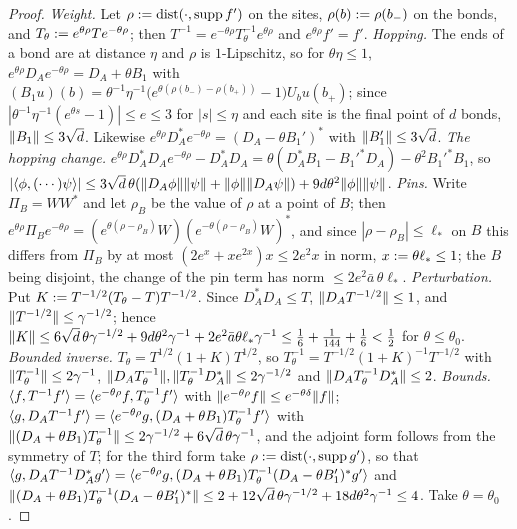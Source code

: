 \begin{proof}
\emph{Weight.} Let $\rho:=\operatorname{dist}(\cdot,\operatorname{supp} f')$ on the sites, $\rho(b):=\rho(b_-)$ on the bonds, and $T_\theta:= e^{\theta\rho}Te^{-\theta\rho}$; then $T^{-1}=e^{-\theta\rho}T_\theta^{-1}e^{\theta\rho}$ and $e^{\theta\rho}f'=f'$. \emph{Hopping.} The ends of a bond are at distance $\eta$ and $\rho$ is $1$-Lipschitz, so for $\theta\eta\le1$, $e^{\theta\rho}D_Ae^{-\theta\rho}=D_A+\theta B_1$ with $(B_1u)(b)=\theta^{-1}\eta^{-1}\big(e^{\theta(\rho(b_-)-\rho(b_+))}-1\big)U_bu(b_+)$; since $|\theta^{-1}\eta^{-1}(e^{\theta s}-1)|\le e\le3$ for $|s|\le\eta$ and each site is the final point of $d$ bonds, $\lVert B_1\rVert\le3\sqrt d$. Likewise $e^{\theta\rho}D_A^*e^{-\theta\rho}=(D_A-\theta B_1')^*$ with $\lVert B_1'\rVert\le3\sqrt d$. \emph{The hopping change.} $e^{\theta\rho}D_A^*D_Ae^{-\theta\rho}-D_A^*D_A=\theta(D_A^*B_1-B_1'^*D_A)-\theta^2B_1'^*B_1$, so $|\langle \phi,(\cdots)\psi\rangle|\le3\sqrt d\,\theta(\lVert D_A\phi\rVert\lVert \psi\rVert+\lVert \phi\rVert\lVert D_A\psi\rVert)+9d\theta^2\lVert \phi\rVert\lVert \psi\rVert$. \emph{Pins.} Write $\Pi_B=WW^*$ and let $\rho_B$ be the value of $\rho$ at a point of $B$; then $e^{\theta\rho}\Pi_Be^{-\theta\rho}=(e^{\theta(\rho-\rho_B)}W)(e^{-\theta(\rho-\rho_B)}W)^*$, and since $|\rho-\rho_B|\le\ell_*$ on $B$ this differs from $\Pi_B$ by at most $(2e^x+xe^{2x})x\le2e^2x$ in norm, $x:=\theta\ell_*\le1$; the $B$ being disjoint, the change of the pin term has norm $\le2e^2\bar a\,\theta\ell_*$. \emph{Perturbation.} Put $K:= T^{-1/2}(T_\theta-T)T^{-1/2}$. Since $D_A^*D_A\le T$, $\lVert D_AT^{-1/2}\rVert\le1$, and $\lVert T^{-1/2}\rVert\le\gamma^{-1/2}$; hence $\lVert K\rVert\le6\sqrt d\,\theta\gamma^{-1/2}+9d\theta^2\gamma^{-1}+2e^2\bar a\theta\ell_*\gamma^{-1}\le\frac16+\frac1{144}+\frac16<\frac12$ for $\theta\le\theta_0$. \emph{Bounded inverse.} $T_\theta=T^{1/2}(1+K)T^{1/2}$, so $T_\theta^{-1}=T^{-1/2}(1+K)^{-1}T^{-1/2}$ with $\lVert T_\theta^{-1}\rVert\le2\gamma^{-1}$, $\lVert D_AT_\theta^{-1}\rVert,\lVert T_\theta^{-1}D_A^*\rVert\le2\gamma^{-1/2}$ and $\lVert D_AT_\theta^{-1}D_A^*\rVert\le2$. \emph{Bounds.} $\langle f,T^{-1}f'\rangle=\langle e^{-\theta\rho}f,T_\theta^{-1}f'\rangle$ with $\lVert e^{-\theta\rho}f\rVert\le e^{-\theta\delta}\lVert f\rVert$; $\langle g,D_AT^{-1}f'\rangle=\langle e^{-\theta\rho}g,(D_A+\theta B_1)T_\theta^{-1}f'\rangle$ with $\lVert (D_A+\theta B_1)T_\theta^{-1}\rVert\le2\gamma^{-1/2}+6\sqrt d\,\theta\gamma^{-1}$, and the adjoint form follows from the symmetry of $T$; for the third form take $\rho:=\operatorname{dist}(\cdot,\operatorname{supp} g')$, so that $\langle g,D_AT^{-1}D_A^*g'\rangle=\langle e^{-\theta\rho}g,(D_A+\theta B_1)T_\theta^{-1}(D_A-\theta B_1')^*g'\rangle$ and $\lVert (D_A+\theta B_1)T_\theta^{-1}(D_A-\theta B_1')^*\rVert\le2+12\sqrt d\,\theta\gamma^{-1/2}+18d\theta^2\gamma^{-1}\le4$. Take $\theta=\theta_0$.
\end{proof}

